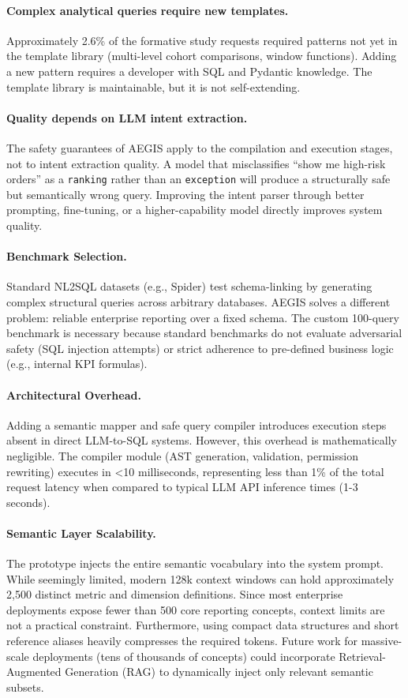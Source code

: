 \documentclass[11pt]{article}
\begin{document}
\paragraph{Complex analytical queries require new templates.} Approximately 2.6\% of the formative study requests required patterns not yet in the template library (multi-level cohort comparisons, window functions). Adding a new pattern requires a developer with SQL and Pydantic knowledge. The template library is maintainable, but it is not self-extending.

\paragraph{Quality depends on LLM intent extraction.} The safety guarantees of AEGIS apply to the compilation and execution stages, not to intent extraction quality. A model that misclassifies ``show me high-risk orders'' as a \texttt{ranking} rather than an \texttt{exception} will produce a structurally safe but semantically wrong query. Improving the intent parser through better prompting, fine-tuning, or a higher-capability model directly improves system quality.

\paragraph{Benchmark Selection.} Standard NL2SQL datasets (e.g., Spider) test schema-linking by generating complex structural queries across arbitrary databases. AEGIS solves a different problem: reliable enterprise reporting over a fixed schema. The custom 100-query benchmark is necessary because standard benchmarks do not evaluate adversarial safety (SQL injection attempts) or strict adherence to pre-defined business logic (e.g., internal KPI formulas).

\paragraph{Architectural Overhead.} Adding a semantic mapper and safe query compiler introduces execution steps absent in direct LLM-to-SQL systems. However, this overhead is mathematically negligible. The compiler module (AST generation, validation, permission rewriting) executes in <10 milliseconds, representing less than 1\% of the total request latency when compared to typical LLM API inference times (1-3 seconds).

\paragraph{Semantic Layer Scalability.} The prototype injects the entire semantic vocabulary into the system prompt. While seemingly limited, modern 128k context windows can hold approximately 2,500 distinct metric and dimension definitions. Since most enterprise deployments expose fewer than 500 core reporting concepts, context limits are not a practical constraint. Furthermore, using compact data structures and short reference aliases heavily compresses the required tokens. Future work for massive-scale deployments (tens of thousands of concepts) could incorporate Retrieval-Augmented Generation (RAG) to dynamically inject only relevant semantic subsets.
\end{document}
